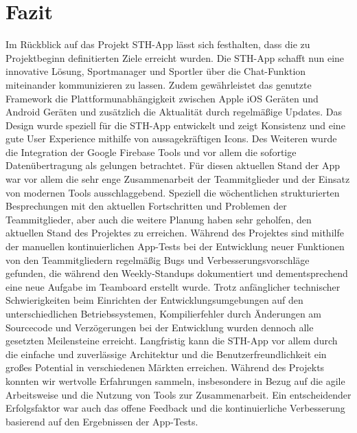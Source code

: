 \chapter{Fazit}
Im Rückblick auf das Projekt STH-App lässt sich festhalten, dass die zu Projektbeginn definitierten Ziele erreicht wurden.
Die STH-App schafft nun eine innovative Lösung, Sportmanager und Sportler über die Chat-Funktion miteinander kommunizieren zu lassen.
Zudem gewährleistet das genutzte Framework die Plattformunabhängigkeit zwischen Apple iOS Geräten und Android Geräten und zusätzlich die Aktualität durch regelmäßige Updates.
Das Design wurde speziell für die STH-App entwickelt und zeigt Konsistenz und eine gute User Experience mithilfe von aussagekräftigen Icons.
Des Weiteren wurde die Integration der Google Firebase Tools und vor allem die sofortige Datenübertragung als gelungen betrachtet.\newline
Für diesen aktuellen Stand der App war vor allem die sehr enge Zusammenarbeit der Teammitglieder und der Einsatz von modernen Tools ausschlaggebend.
Speziell die wöchentlichen strukturierten Besprechungen mit den aktuellen Fortschritten und Problemen der Teammitglieder, aber auch die weitere Planung haben sehr geholfen, den aktuellen Stand des Projektes zu erreichen.
Während des Projektes sind mithilfe der manuellen kontinuierlichen App-Tests bei der Entwicklung neuer Funktionen von den Teammitgliedern regelmäßig Bugs und Verbesserungsvorschläge gefunden, die während den Weekly-Standups dokumentiert und dementsprechend eine neue Aufgabe im Teamboard erstellt wurde.\newline
Trotz anfänglicher technischer Schwierigkeiten beim Einrichten der Entwicklungsumgebungen auf den unterschiedlichen Betriebssystemen, Kompilierfehler durch Änderungen am Sourcecode und Verzögerungen bei der Entwicklung wurden dennoch alle gesetzten Meilensteine erreicht.
Langfristig kann die STH-App vor allem durch die einfache und zuverlässige Architektur und die Benutzerfreundlichkeit ein großes Potential in verschiedenen Märkten erreichen.\newline
Während des Projekts konnten wir wertvolle Erfahrungen sammeln, insbesondere in Bezug auf die agile Arbeitsweise und die Nutzung von Tools zur Zusammenarbeit.
Ein entscheidender Erfolgsfaktor war auch das offene Feedback und die kontinuierliche Verbesserung basierend auf den Ergebnissen der App-Tests.

